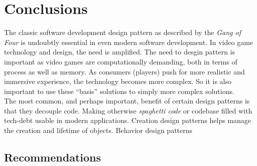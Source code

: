 \section{Conclusions}

\iftwocolumns
\begin{multicols}{2}
\fi

The classic software development design pattern as described by the \textit{Gang of Four}\cite{gof} is undoubtly essential in even modern software development. In video game technology and design, the need is amplified. The need to desgin pattern is important as video games are computationally demanding, both in terms of process as well as memory. As consumers (players) push for more realistic and immersive experience, the technology becomes more complex. So it is also important to use these ``basis'' solutions to simply more complex solutions.\bs
\\
The most common, and perhaps important, benefit of certain design patterns is that they decouple code. Making otherwise \textit{spaghetti code} or codebase filled with tech-debt usable in modern applications. Creation design patterns helps manage the creation and lifetime of objects. Behavior design patterns 

\subsection{Recommendations}


\end{multicols}
